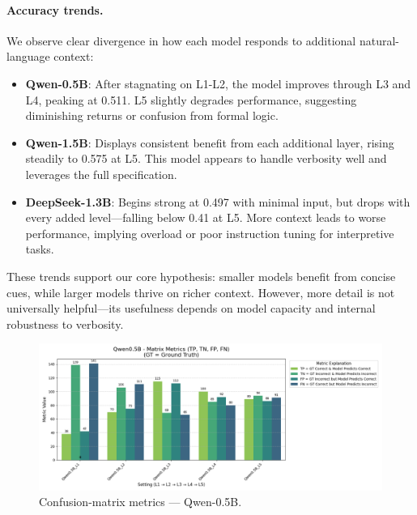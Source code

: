\documentclass[a4paper]{usiinfbachelorproject}
\begin{document}
\paragraph*{Accuracy trends.}
We observe clear divergence in how each model responds to additional natural-language context:

\begin{itemize}[leftmargin=12pt]
  \item \textbf{Qwen-0.5B}: After stagnating on L1-L2, the model improves through L3 and L4, peaking at 0.511. L5 slightly degrades performance, suggesting diminishing returns or confusion from formal logic.
  
  \item \textbf{Qwen-1.5B}: Displays consistent benefit from each additional layer, rising steadily to 0.575 at L5. This model appears to handle verbosity well and leverages the full specification.

  \item \textbf{DeepSeek-1.3B}: Begins strong at 0.497 with minimal input, but drops with every added level—falling below 0.41 at L5. More context leads to worse performance, implying overload or poor instruction tuning for interpretive tasks.
\end{itemize}

These trends support our core hypothesis: smaller models benefit from concise cues, while larger models thrive on richer context. However, more detail is not universally helpful—its usefulness depends on model capacity and internal robustness to verbosity.

\vspace{0.8em}

\begin{figure}[H]\centering
  \includegraphics[width=\linewidth]{figures/Qwen0.5B_matrix_metrics.png}
  \caption{Confusion-matrix metrics — Qwen-0.5B.}
  \label{fig:q05-matrix}
\end{figure}
\end{document}
